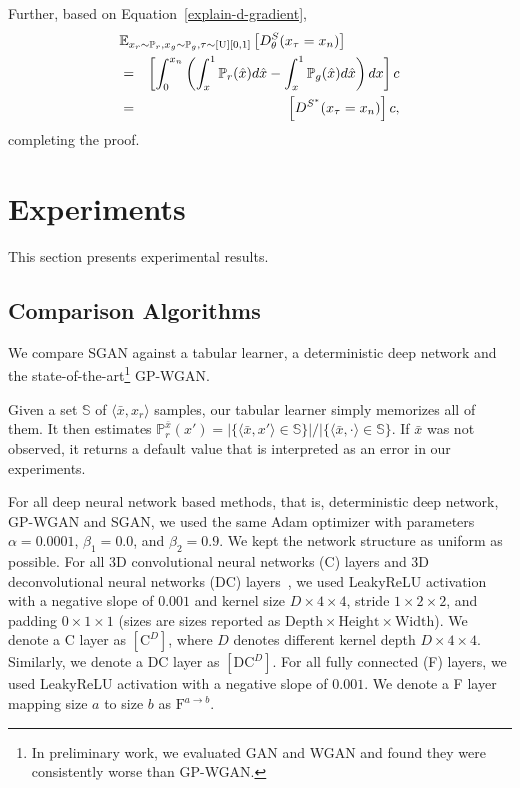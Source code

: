 \documentclass[letterpaper]{article} %
\begin{document}
Further,
based on Equation~\eqref{explain-d-gradient},
\begin{eqnarray}
\lefteqn{\mathbb{E}_{x_r\sim\mathbb{P}_r,x_g\sim\mathbb{P}_g, \tau \sim [\text{U}][0,1]} \left[ D_{\theta}^S(x_{\tau}=x_n) \right]} \nonumber\\
    &=& \left[\int^{x_n}_{0} \left( \int_{x}^{1} \mathbb{P}_r(\hat{x}) d \hat{x} - \int_{x}^{1} \mathbb{P}_g(\hat{x}) d \hat{x} \right) d x \right] c \nonumber\\
    &=& \left[ D^{S^\ast}(x_{\tau}=x_n) \right] c,
\end{eqnarray}
completing the proof.

\section{Experiments}

This section presents experimental results.

\subsection{Comparison Algorithms}

We compare SGAN against a tabular learner, a deterministic deep network and the state-of-the-art\footnote{In preliminary work, we evaluated GAN and WGAN and found they were consistently worse than GP-WGAN.} GP-WGAN.

Given a set $\mathbb{S}$ of $\langle \bar{x},x_r\rangle$ samples, our tabular learner simply memorizes all of them. It then estimates $\mathbb{P}^{\bar{x}}_{r}(x') = |\{\langle \bar{x},x'\rangle \in \mathbb{S}\}|/ |\{ \langle \bar{x},\cdot\rangle \in \mathbb{S}\}$. If $\bar{x}$ was not observed, it returns a default value that is interpreted as an error in our experiments.

For all deep neural network based methods, that is, deterministic deep network, GP-WGAN and SGAN, we used the same Adam optimizer with parameters $\alpha=0.0001$, $\beta_1=0.0$, and $\beta_2=0.9$. We kept the network structure as uniform as possible.  For all 3D convolutional neural networks (C) layers and 3D deconvolutional neural networks (DC) layers~\cite{ji20133d}, we used LeakyReLU activation with a negative slope of $0.001$ and kernel size $D\times4\times4$, stride $1\times2\times2$, and padding $0\times1\times1$ (sizes are sizes reported as $\text{Depth}\times\text{Height}\times\text{Width}$).
We denote a C layer as $[\text{C}^D]$, where $D$ denotes different kernel depth $D\times4\times4$. Similarly, we denote a DC layer as $[\text{DC}^D]$. For all fully connected (F) layers, we used LeakyReLU activation with a negative slope of $0.001$. We denote a F layer mapping size $a$ to size $b$ as $\text{F}^{a\rightarrow b}$. 
\end{document}
